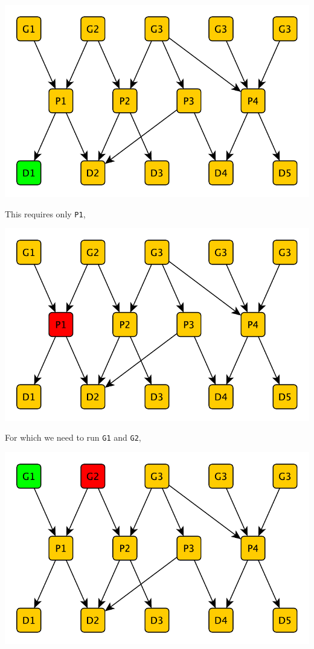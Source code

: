 \documentclass[a4paper]{article}
\def\G#1{\texttt{G#1}\xspace}
\def\P#1{\texttt{P#1}\xspace}
\begin{document}
\centerline{\includegraphics[scale=0.5]{img/network3-drivers-w1.pdf}}

This requires only \P1,

\centerline{\includegraphics[scale=0.5]{img/network4-varsneeded-w1.pdf}}

For which we need to run \G1 and \G2,

\centerline{\includegraphics[scale=0.5]{img/network5-gensneeded-w1.pdf}}
\end{document}
